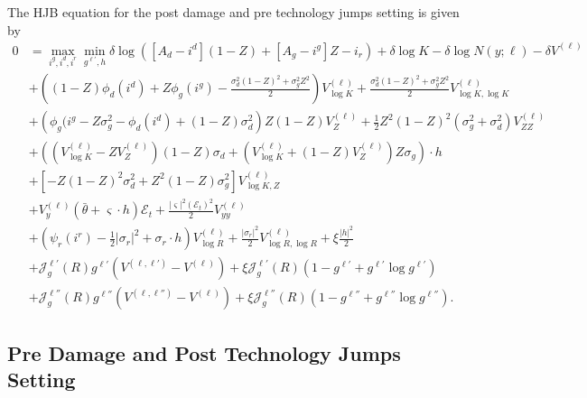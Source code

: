 \documentclass[12pt]{article}
\begin{document}
\begin{appendices}
The HJB equation for the post damage and pre technology jumps setting is given by
\begin{equation*}
\begin{split}
0 & = \max_{i^{g},i^{d},i^{r}} \min_{g^{\ell'}, h} \delta\log([A_{d}-i^{d}](1-Z)+[A_{g}-i^{g}]Z -i_{r}) + \delta \log K - \delta \log N(y; \ell) - \delta V^{(\ell)} \\
& + \left((1-Z) \phi_d(i^{d}) +Z \phi_g(i^{g}) -\frac{   \sigma_d^2 (1-Z)^2 + \sigma_g^2 Z^2 }{2} \right)V^{(\ell)}_{\log K} + \frac{  \sigma_d^2 (1-Z)^2 + \sigma_g^2 Z^2}{2} V^{(\ell)}_{\log K,  \log K}  \\
 & +\left( \phi_g(i^{g} - Z \sigma_g^2 - \phi_d(i^{d}) + (1-Z) \sigma_d^2  \right) Z (1-Z) V^{(\ell)}_{Z} + \frac{1}{2} Z^2 (1-Z)^2 ({ \sigma_g^2 + \sigma_d^2} ) V^{(\ell)}_{ZZ} \\
 & + \left( \left( V^{(\ell)}_{\log K} -  Z V^{(\ell)}_{Z} \right) (1-Z) \sigma_d  + \left( V^{(\ell)}_{\log K} + (1-Z) V^{(\ell)}_{Z} \right)  Z \sigma_g \right) \cdot h \\
  & + \left[-Z(1-Z)^2\sigma_d^2 + Z^2(1-Z)\sigma_g^2\right]V^{(\ell)}_{\log K, Z} \\
 & + V^{(\ell)}_{y} (\bar{\theta} + \varsigma \cdot h) \mathcal{E}_t +\frac{|\varsigma|^{2}( \mathcal{E}_t)^{2}}{2} V^{(\ell)}_{yy} \\
  & +\left(\psi_{r}(i^{r})-\frac{1}{2}|\sigma_{r}|^{2} + \sigma_{r} \cdot h \right) V^{(\ell)}_{\log R}  +\frac{|\sigma_{r}|^{2}}{2}V^{(\ell)}_{\log R,\log R} + \xi \frac{|h|^2}{2} \\
 & + \mathcal{J}^{\ell'}_g(R) g^{\ell'} (V^{(\ell,\ell')}-V^{(\ell)}) + \xi  \mathcal{J}^{\ell'}_g(R) \left( 1 - g^{\ell'} + g^{\ell'} \log g^{\ell'} \right) \\
 & + \mathcal{J}^{\ell''}_g(R) g^{\ell''} (V^{(\ell,\ell'')}-V^{(\ell)}) + \xi  \mathcal{J}^{\ell''}_g(R) \left( 1 - g^{\ell''} + g^{\ell''} \log g^{\ell''} \right).
\end{split}
\end{equation*}


\subsection{Pre Damage and Post Technology Jumps Setting}


\end{appendices}
\end{document}
